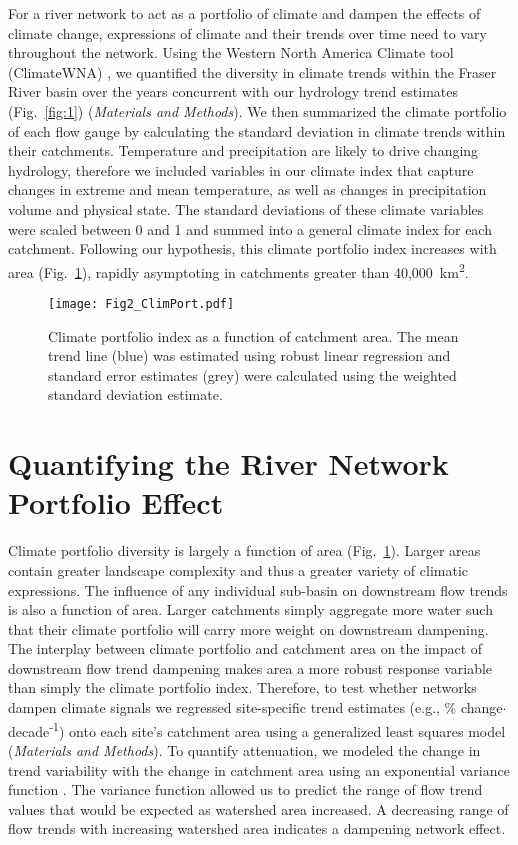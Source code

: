 \documentclass[9pt,twocolumn,twoside,lineno]{pnas-new}
\begin{document}
For a river network to act as a portfolio of climate and dampen the effects of climate change, expressions of climate and their trends over time need to vary throughout the network. Using the Western North America Climate tool (ClimateWNA) \cite{Wang:2016}, we quantified the diversity in climate trends within the Fraser River basin over the years concurrent with our hydrology trend estimates (Fig.~\ref{fig:1}) (\textit{Materials and Methods}). We then summarized the climate portfolio of each flow gauge by calculating the standard deviation in climate trends within their catchments. Temperature and precipitation are likely to drive changing hydrology, therefore we included variables in our climate index that capture changes in extreme and mean temperature, as well as changes in precipitation volume and physical state. The standard deviations of these climate variables were scaled between 0 and 1 and summed into a general climate index for each catchment. Following our hypothesis, this climate portfolio index increases with area (Fig.~\ref{fig:2}), rapidly asymptoting in catchments greater than 40,000~km\textsuperscript{2}.

\begin{figure}[h]
\centering
\texttt{[image: Fig2\_ClimPort.pdf]}
	\caption{Climate portfolio index as a function of catchment area. The mean trend line (blue) was estimated using robust linear regression and standard error estimates (grey) were calculated using the weighted standard deviation estimate.}
\label{fig:2}
\end{figure}

\section*{Quantifying the River Network Portfolio Effect}
Climate portfolio diversity is largely a function of area (Fig.~\ref{fig:2}). Larger areas contain greater landscape complexity and thus a greater variety of climatic expressions. The influence of any individual sub-basin on downstream flow trends is also a function of area. Larger catchments simply aggregate more water such that their climate portfolio will carry more weight on downstream dampening. The interplay between climate portfolio and catchment area on the impact of downstream flow trend dampening makes area a more robust response variable than simply the climate portfolio index. Therefore, to test whether networks dampen climate signals we regressed site-specific trend estimates (e.g., \% change$\cdot$decade\textsuperscript{-1}) onto each site's catchment area using a generalized least squares model (\textit{Materials and Methods}). To quantify attenuation, we modeled the change in trend variability with the change in catchment area using an exponential variance function \cite{Pinheiro:2000}. The variance function allowed us to predict the range of flow trend values that would be expected as watershed area increased. A decreasing range of flow trends with increasing watershed area indicates a dampening network effect.
\end{document}
